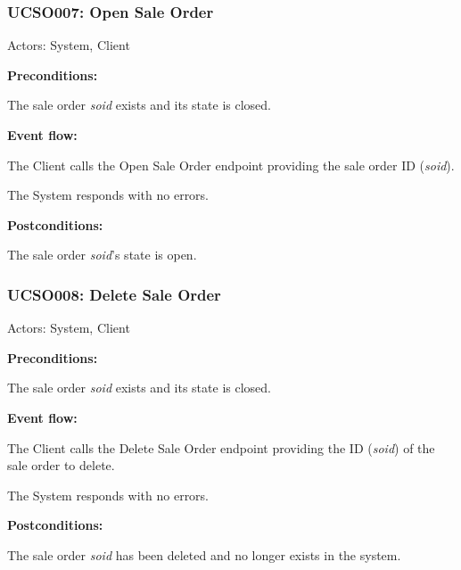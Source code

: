 \begin{ucbox}{\subsubsection{UCSO007: Open Sale Order}}
\label{UCSO007}

Actors: System, Client

\textbf{Preconditions:}

\ucitem The sale order \textit{soid} exists and its state is closed.

\textbf{Event flow:}

\ucitem The Client calls the Open Sale Order endpoint providing the sale order ID (\textit{soid}).

\ucitem The System responds with no errors.

\textbf{Postconditions:}

\ucitem The sale order \textit{soid}’s state is open.

\end{ucbox}

\begin{ucbox}{\subsubsection{UCSO008: Delete Sale Order}}
\label{UCSO008}

Actors: System, Client

\textbf{Preconditions:}

\ucitem The sale order \textit{soid} exists and its state is closed.

\textbf{Event flow:}

\ucitem The Client calls the Delete Sale Order endpoint providing the ID (\textit{soid}) of the sale order to delete.

\ucitem The System responds with no errors.

\textbf{Postconditions:}

\ucitem The sale order \textit{soid} has been deleted and no longer exists in the system.

\end{ucbox}

